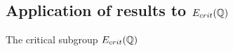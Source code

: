 \documentclass[handout]{beamer}
\begin{document}





\subsection{Application of results to $E_{crit}(\mathbb{Q})$}

\begin{frame}{The critical subgroup $E_{crit}(\mathbb{Q})$}






\end{frame}
\end{document}
